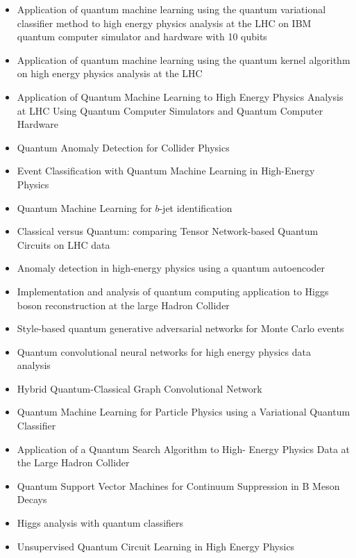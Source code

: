 \begin{itemize}
   \item Application of quantum machine learning using the quantum variational classifier method to high energy physics analysis at the LHC on IBM quantum computer simulator and hardware with 10 qubits~\cite{Wu:2020cye}
   \item Application of quantum machine learning using the quantum kernel algorithm on high energy physics analysis at the LHC~\cite{Wu:2021xsj}
   \item Application of Quantum Machine Learning to High Energy Physics Analysis at LHC Using Quantum Computer Simulators and Quantum Computer Hardware~\cite{Wu:2022tnc}
   \item Quantum Anomaly Detection for Collider Physics~\cite{Alvi:2022fkk}
   \item Event Classification with Quantum Machine Learning in High-Energy Physics~\cite{Terashi:2020wfi}
   \item Quantum Machine Learning for $b$-jet identification~\cite{Gianelle:2022unu}
   \item Classical versus Quantum: comparing Tensor Network-based Quantum Circuits on LHC data~\cite{Araz:2022haf}
   \item Anomaly detection in high-energy physics using a quantum autoencoder~\cite{Ngairangbam:2021yma}
   \item Implementation and analysis of quantum computing application to Higgs boson reconstruction at the large Hadron Collider~\cite{AlexiadesArmenakas:2021lrs}
   \item Style-based quantum generative adversarial networks for Monte Carlo events~\cite{Bravo-Prieto:2021ehz}
   \item Quantum convolutional neural networks for high energy physics data analysis~\cite{Chen:2020zkj}
   \item Hybrid Quantum-Classical Graph Convolutional Network~\cite{Chen:2021ouz}
   \item Quantum Machine Learning for Particle Physics using a Variational Quantum Classifier~\cite{Blance:2020nhl}
   \item Application of a Quantum Search Algorithm to High- Energy Physics Data at the Large Hadron Collider~\cite{Armenakas:2020ymp}
   \item Quantum Support Vector Machines for Continuum Suppression in B Meson Decays~\cite{Heredge:2021vww}
   \item Higgs analysis with quantum classifiers~\cite{Belis:2021zqi}
   \item Unsupervised Quantum Circuit Learning in High Energy Physics~\cite{Delgado:2022aty}
\end{itemize}


